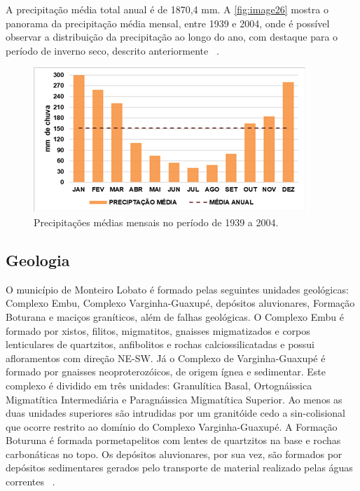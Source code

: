 A precipitação média total anual é de 1870,4 mm. A \autoref{fig:image26} mostra o panorama da precipitação média mensal, entre 1939 e 2004, onde é possível observar a distribuição da precipitação ao longo do ano, com destaque para o período de inverno seco, descrito anteriormente ~\cite{MonteiroLobato2014}.

 \begin{figure}[h!]
	\centering
	\includegraphics[width=1\linewidth]{produtos/proddois/image26}
	\caption{Precipitações médias mensais no período de 1939 a 2004.}
	\label{fig:image26}
\end{figure}

\subsection{Geologia}

O município de Monteiro Lobato é formado pelas seguintes unidades geológicas: Complexo Embu, Complexo Varginha-Guaxupé, depósitos aluvionares, Formação Boturana e maciços graníticos, além de falhas geológicas. O Complexo Embu é formado por xistos, filitos, migmatitos, gnaisses migmatizados e corpos lenticulares de quartzitos, anfibolitos e rochas calciossilicatadas e possui afloramentos com direção NE-SW. Já o Complexo de Varginha-Guaxupé é formado por gnaisses neoproterozóicos, de origem ígnea e sedimentar. Este complexo é dividido em três unidades: Granulítica Basal, Ortognáissica Migmatítica Intermediária e Paragnáissica Migmatítica Superior.  Ao menos as duas unidades superiores são intrudidas por um granitóide cedo a sin-colisional que ocorre restrito ao domínio do Complexo Varginha-Guaxupé. A Formação Boturuna é formada pormetapelitos com lentes de quartzitos na base e rochas carbonáticas no topo. Os depósitos aluvionares, por sua vez, são formados por depósitos sedimentares gerados pelo transporte de material realizado pelas águas correntes ~\cite{CPRM}.

